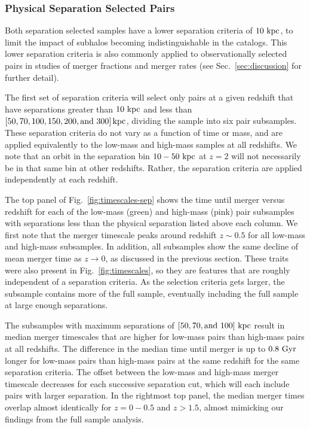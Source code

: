 \documentclass[twocolumn,linenumbers]{aastex631}
\begin{document}
    \subsubsection{Physical Separation Selected Pairs }
    \label{sec:results-phys}
        Both separation selected samples have a lower separation criteria of $10\,\mathrm{\,kpc}$, to limit the impact of subhalos becoming indistinguishable in the \subfind{} catalogs.
        This lower separation criteria is also commonly applied to observationally selected pairs in studies of merger fractions and merger rates (see Sec.~\ref{sec:discussion} for further detail).
        
        The first set of separation criteria will select only pairs at a given redshift that have separations greater than $10\,\mathrm{\,kpc}$ and less than $[50, 70, 100, 150, 200, \mbox{and }300]\mathrm{\,kpc}$, dividing the sample into six pair subsamples. 
        These separation criteria do not vary as a function of time or mass, and are applied equivalently to the low-mass and high-mass samples at all redshifts. 
        We note that an orbit in the separation bin $10-50\,\mathrm{\,kpc}$ at $z=2$ will not necessarily be in that same bin at other redshifts. 
        Rather, the separation criteria are applied independently at each redshift. 
        
        The top panel of Fig.~\ref{fig:timescales-sep} shows the time until merger versus redshift for each of the low-mass (green) and high-mass (pink) pair subsamples with separations less than the physical separation listed above each column.  
        We first note that the merger timescale peaks around redshift $z\sim0.5$ for all low-mass and high-mass subsamples. 
        In addition, all subsamples show the same decline of mean merger time as $z\to0$, as discussed in the previous section. 
        These traits were also present in Fig.~\ref{fig:timescales}, so they are features that are roughly independent of a separation criteria.
        As the selection criteria gets larger, the subsample contains more of the full sample, eventually including the full sample at large enough separations.
        
        The subsamples with maximum separations of $[50, 70, \mbox{and } 100]\,\mathrm{\,kpc}$ result in median merger timescales that are higher for low-mass pairs than high-mass pairs at all redshifts. 
        The difference in the median time until merger is up to $0.8\,\mathrm{\,Gyr}$ longer for low-mass pairs than high-mass pairs at the same redshift for the same separation criteria. 
        The offset between the low-mass and high-mass merger timescale decreases for each successive separation cut, which will each include pairs with larger separation. 
        In the rightmost top panel, the median merger times overlap almost identically for $z=0-0.5$ and $z>1.5$, almost mimicking our findings from the full sample analysis. 
        
\end{document}

